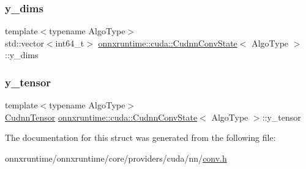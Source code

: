 \mbox{\label{structonnxruntime_1_1cuda_1_1CudnnConvState_a04e5b53d56e214e67efaa2125bb908ff}} 
\subsubsection{\texorpdfstring{y\+\_\+dims}{y\_dims}}
{\footnotesize\ttfamily template$<$typename Algo\+Type$>$ \\
std\+::vector$<$int64\+\_\+t$>$ \mbox{\hyperlink{structonnxruntime_1_1cuda_1_1CudnnConvState}{onnxruntime\+::cuda\+::\+Cudnn\+Conv\+State}}$<$ Algo\+Type $>$\+::y\+\_\+dims}

\mbox{\label{structonnxruntime_1_1cuda_1_1CudnnConvState_aebb7cdf4e79a3d5ee09ad81240ca3a97}} 
\subsubsection{\texorpdfstring{y\+\_\+tensor}{y\_tensor}}
{\footnotesize\ttfamily template$<$typename Algo\+Type$>$ \\
\mbox{\hyperlink{classonnxruntime_1_1cuda_1_1CudnnTensor}{Cudnn\+Tensor}} \mbox{\hyperlink{structonnxruntime_1_1cuda_1_1CudnnConvState}{onnxruntime\+::cuda\+::\+Cudnn\+Conv\+State}}$<$ Algo\+Type $>$\+::y\+\_\+tensor}



The documentation for this struct was generated from the following file\+:\begin{DoxyCompactItemize}
\item 
onnxruntime/onnxruntime/core/providers/cuda/nn/\mbox{\hyperlink{cuda_2nn_2conv_8h}{conv.\+h}}\end{DoxyCompactItemize}
